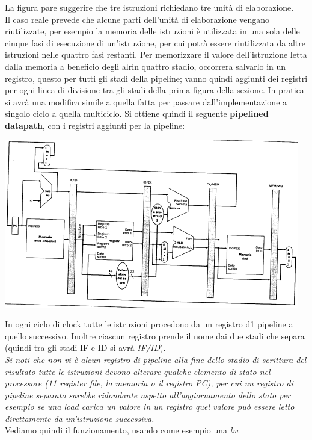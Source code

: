 \documentclass[a4paper,12pt, oneside]{book}
\begin{document}
La figura pare suggerire che tre istruzioni richiedano tre unità di
elaborazione.\\
Il caso reale prevede che alcune parti dell'unità di elaborazione
vengano riutilizzate, per esempio la memoria delle istruzioni è
utilizzata in una sola delle cinque fasi di esecuzione di
un'istruzione, per cui potrà essere riutilizzata da altre istruzioni nelle quattro fasi restanti.
Per memorizzare il valore dell'istruzione letta dalla memoria a beneficio degli
alrin quattro stadio, occorrera salvarlo in un registro, questo per
tutti gli stadi della pipeline; vanno quindi aggiunti dei registri per
ogni linea di divisione tra gli stadi della prima figura della
sezione. In pratica si avrà una modifica simile a quella fatta per
passare dall'implementazione a singolo ciclo a quella multiciclo. Si
ottiene quindi il seguente \textbf{pipelined datapath}, con i registri
aggiunti per la pipeline:
\begin{center}
  \includegraphics[scale = 0.7]{img/pipe3.png}
\end{center}
In ogni ciclo di clock tutte le istruzioni procedono da un registro d1
pipeline a quello successivo. Inoltre ciascun registro prende il nome
dai due stadi che separa (quindi tra gli stadi IF e ID si avrà
\textit{IF/ID}).\\
\textit{Si noti che non vi è alcun registro di pipeline alla fine
  dello stadio di scrittura del risultato tutte le istruzioni devono
  alterare qualche elemento di stato nel processore (11 register file,
  la memoria o il registro PC), per cui un registro di pipeline
  separato sarebbe ridondante nspetto all'aggiornamento dello stato
  per esempio se una load carica un valore in un registro quel valore
  può essere letto direttamente da un'istruzione successiva.}\\
Vediamo quindi il funzionamento, usando come esempio una \textit{lw}:
\end{document}
